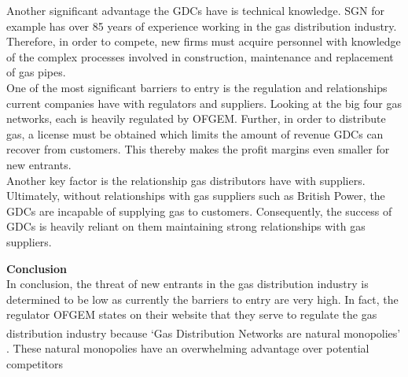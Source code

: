\documentclass[11pt]{article}		%
\newcommand{\supercite}[1]{\textsuperscript{\cite{#1}}}		%
\begin{document}
				Another significant advantage the GDCs have is technical knowledge. SGN for example has over 85 years of experience working in the gas distribution industry. Therefore, in order to compete, new firms must acquire personnel with knowledge of the complex processes involved in construction, maintenance and replacement of gas pipes. \\
				One of the most significant barriers to entry is the regulation and relationships current companies have with regulators and suppliers. Looking at the big four gas networks, each is heavily regulated by OFGEM. Further, in order to distribute gas, a license must be obtained which limits the amount of revenue GDCs can recover from customers. This thereby makes the profit margins even smaller for new entrants. \\
	            \hspace*{3ex}Another key factor is the relationship gas distributors have with suppliers. Ultimately, without relationships with gas suppliers such as British Power, the GDCs are incapable of supplying gas to customers. Consequently, the success of GDCs is heavily reliant on them maintaining strong relationships with gas suppliers.

			    \textbf{Conclusion}\\
                In conclusion, the threat of new entrants in the gas distribution industry is determined to be low as currently the barriers to entry are very high. In fact, the regulator OFGEM states on their website that they serve to regulate the gas distribution industry because ‘Gas Distribution Networks are natural monopolies’ \supercite{ofgemquote}. These natural monopolies have an overwhelming advantage over potential competitors
\end{document}
